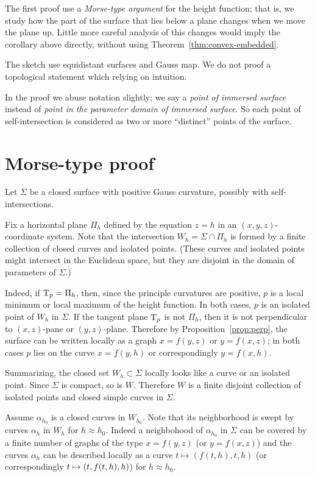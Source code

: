 The first proof use a \emph{Morse-type argument} for the height function;
that is, we study how the part of the surface that lies below a plane changes when we move the plane up.
Little more careful analysis of this changes would imply the corollary above directly, without using Theorem~\ref{thm:convex-embedded}.

The sketch use equidistant surfaces and Gauss map.
We do not proof a topological statement which relying on intuition.

In the proof we abuse notation slightly;
we say a \emph{point of immersed surface} instead of \emph{point in the parameter domain of immersed surface}.
So each point of self-intersection is considered as two or more ``distinct'' points of the surface.

\section{Morse-type proof}

Let $\Sigma$ be a closed surface with positive Gauss curvature, possibly with self-intersections. 

Fix a horizontal plane $\Pi_h$ defined by the equation $z=h$ in an $(x,y,z)$-coordinate system.
Note that the intersection $W_h=\Sigma\cap\Pi_h$ is formed by a finite collection of closed curves and isolated points.
(These curves and isolated points might intersect in the Euclidean space, but they are disjoint in the domain of parameters of $\Sigma$.)

Indeed, if $\mathrm{T}_p=\Pi_h$, then, since the principle curvatures are positive, $p$ is a local minimum or local maximum of the height function.
In both cases, $p$ is an isolated point of $W_h$ in $\Sigma$.
If the tangent plane $\mathrm{T}_p$ is not $\Pi_h$, then it is not perpendicular to $(x,z)$-pane or $(y,z)$-plane.
Therefore by Proposition~\ref{prop:perp}, the surface can be written locally as a graph $x=f(y,z)$ or $y=f(x,z)$;
in both cases $p$ lies on the curve $x=f(y,h)$ or correspondingly $y=f(x,h)$.

Summarizing, the closed set $W_h\subset \Sigma$ locally looks like a curve or an isolated point.
Since $\Sigma$ is compact, so is $W$.
Therefore $W$ is a finite disjoint collection of isolated points and closed simple curves in $\Sigma$.

Assume $\alpha_{h_0}$ is a closed curves in $W_{h_0}$.
Note that its neighborhood is swept by curves $\alpha_h$ in $W_{h}$ for $h\approx h_0$.
Indeed a neighbohood of $\alpha_{h_0}$ in $\Sigma$ can be covered by a finite number of graphs of the type $x=f(y,z)$ (or $y=f(x,z)$) and the curves $\alpha_h$ can be described locally as a curve $t\mapsto (f(t,h),t,h)$ (or correspondingly $t\z\mapsto(t,f(t,h),h)$) for $h\approx h_0$.

